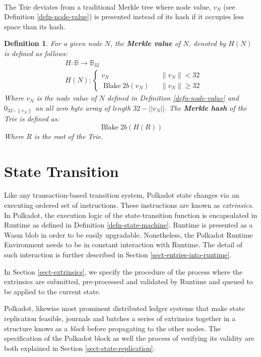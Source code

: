 \documentclass{book}
\newcommand{\tmem}[1]{{\em #1\/}}
\newcommand{\tmop}[1]{\ensuremath{\operatorname{#1}}}
\newcommand{\tmstrong}[1]{\textbf{#1}}
\newcommand{\tmtextbf}[1]{{\bfseries{#1}}}
\newcommand{\tmtextit}[1]{{\itshape{#1}}}
\newtheorem{definition}{Definition}
\providecommand{\tmem}[1]{\tmtextit{#1}}
\providecommand{\tmop}[1]{\ensuremath{\mathrm{#1}}}
\providecommand{\tmstrong}[1]{\tmtextbf{#1}}
\providecommand{\tmtextbf}[1]{\tmtextbf{#1}}
\providecommand{\tmtextit}[1]{\tmtextit{#1}}
\newtheorem{definition}{Definition}
\begin{document}
\

The Trie deviates from a traditional Merkle tree where node value, $v_N$ (see
Definition \ref{defn-node-value}) is presented instead of its hash if it
occupies less space than its hash.

\begin{definition}
  \label{defn-merkle-value}For a given node $N$, the {\tmstrong{Merkle value}}
  of $N$, denoted by $H (N)$ is defined as follows:
  \[ \begin{array}{ll}
       & H : \mathbb{B} \rightarrow \mathbb{B}_{32}\\
       & H (N) : \left\{ \begin{array}{lcl}
         v_N &  & \|v_N \|< 32\\
         \tmop{Blake} 2 b (v_N) &  & \|v_N \| \geqslant 32
       \end{array} \right.
     \end{array} \]
  Where $v_N$ is the node value of $N$ defined in Definition
  \ref{defn-node-value} and $0_{32 - \| v_N \|}$ an all zero byte array of
  length $32 - | | v_N | |$. The {\tmstrong{Merkle hash}} of the Trie is
  defined as:
  \[ \tmop{Blake} 2 b (H (R)) \]
  Where $R$ is the root of the Trie.
\end{definition}

\chapter{State Transition}\label{chap-state-transit}

Like any transaction-based transition system, Polkadot state changes via an
executing ordered set of instructions. These instructions are known as
{\tmem{extrinsics}}. In Polkadot, the execution logic of the state-transition
function is encapsulated in Runtime as defined in Definition
\ref{defn-state-machine}. Runtime is presented as a Wasm blob in order to be
easily upgradable. Nonetheless, the Polkadot Runtime Environment needs to be
in constant interaction with Runtime. The detail of such interaction is
further described in Section \ref{sect-entries-into-runtime}.

In Section \ref{sect-extrinsics}, we specify the procedure of the process
where the extrinsics are submitted, pre-processed and validated by Runtime and
queued to be applied to the current state.

Polkadot, likewise most prominent distributed ledger systems that make state
replication feasible, journals and batches a series of extrinsics together in
a structure knows as a {\tmem{block}} before propagating to the other nodes.
The specification of the Polkadot block as well the process of verifying its
validity are both explained in Section \ref{sect-state-replication}.
\end{document}

